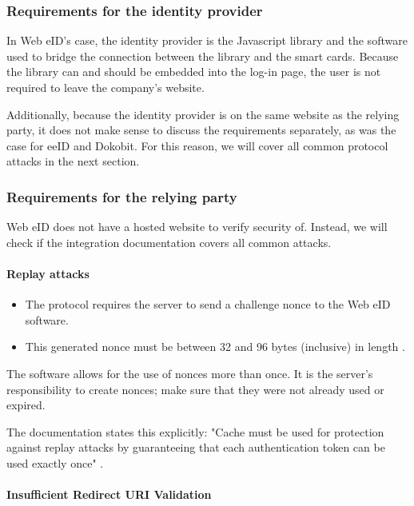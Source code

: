 \subsubsection{Requirements for the identity provider}

In Web eID's case, the identity provider is the Javascript library and the software used to bridge the connection between the library and the smart cards. Because the library can and should be embedded into the log-in page, the user is not required to leave the company's website.

Additionally, because the identity provider is on the same website as the relying party, it does not make sense to discuss the requirements separately, as was the case for eeID and Dokobit. For this reason, we will cover all common protocol attacks in the next section.

\subsubsection{Requirements for the relying party}

Web eID does not have a hosted website to verify security of. Instead, we will check if the integration documentation covers all common attacks.

\paragraph{Replay attacks}

\begin{itemize}
  \item The protocol requires the server to send a challenge nonce to the Web eID software.
  \item This generated nonce must be between 32 and 96 bytes (inclusive) in length \cite{ria-webeid-source-web-eid-app-authenticate}.
\end{itemize}

The software allows for the use of nonces more than once. It is the server's responsibility to create nonces; make sure that they were not already used or expired.

The documentation states this explicitly: "Cache must be used for protection against replay attacks by guaranteeing that each authentication token can be used exactly once" \cite{ria-webeid-source-web-eid-authtoken-validation-java-readme}.

\paragraph{Insufficient Redirect URI Validation}


